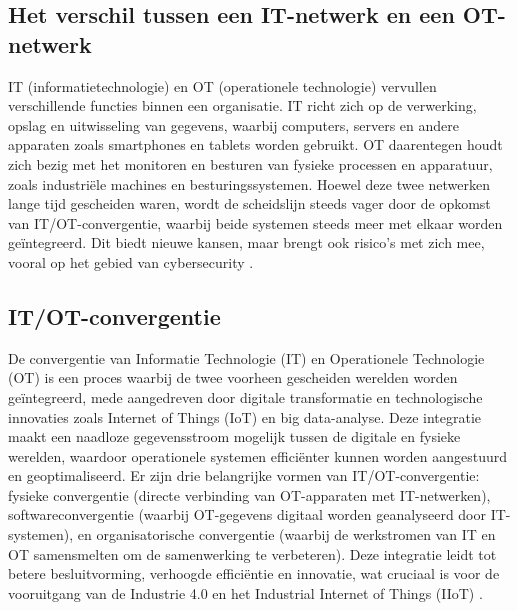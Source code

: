 \subsection{Het verschil tussen een IT-netwerk en een OT-netwerk}
IT (informatietechnologie) en OT (operationele technologie) vervullen verschillende functies binnen een organisatie. IT richt zich op de verwerking, opslag en 
uitwisseling van gegevens, waarbij computers, servers en andere apparaten zoals smartphones en tablets worden gebruikt. OT daarentegen houdt zich bezig met het 
monitoren en besturen van fysieke processen en apparatuur, zoals industriële machines en besturingssystemen. Hoewel deze twee netwerken lange tijd gescheiden waren, 
wordt de scheidslijn steeds vager door de opkomst van IT/OT-convergentie, waarbij beide systemen steeds meer met elkaar worden geïntegreerd. Dit biedt nieuwe kansen, 
maar brengt ook risico’s met zich mee, vooral op het gebied van cybersecurity \autocite{onlogic2023}.

\subsection{IT/OT-convergentie}
De convergentie van Informatie Technologie (IT) en Operationele Technologie (OT) is een proces waarbij de twee voorheen gescheiden werelden worden geïntegreerd, mede aangedreven door digitale 
transformatie en technologische innovaties zoals Internet of Things (IoT) en big data-analyse. Deze integratie maakt een naadloze gegevensstroom mogelijk tussen de digitale en fysieke werelden, 
waardoor operationele systemen efficiënter kunnen worden aangestuurd en geoptimaliseerd. Er zijn drie belangrijke vormen van IT/OT-convergentie: fysieke convergentie (directe verbinding van OT-apparaten met IT-netwerken), 
softwareconvergentie (waarbij OT-gegevens digitaal worden geanalyseerd door IT-systemen), en organisatorische convergentie (waarbij de werkstromen van IT en OT samensmelten om de samenwerking te verbeteren). Deze integratie 
leidt tot betere besluitvorming, verhoogde efficiëntie en innovatie, wat cruciaal is voor de vooruitgang van de Industrie 4.0 en het Industrial Internet of Things (IIoT) \autocite{maleh2021ot,paloaltonetworks2023}.

